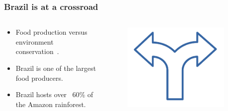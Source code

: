 \documentclass[aspectratio=169]{beamer}
\begin{document}
\begin{frame}
    \frametitle{Brazil is at a crossroad}
    \begin{columns}
        \begin{column}{0.5\textwidth}
            \begin{itemize}
                \item Food production versus environment 
                    conservation~\cite{garnett2011}.
                \item Brazil is one of the largest food producers. 
                \item Brazil hosts over ~60\% of the Amazon rainforest.
            \end{itemize}
        \end{column}
        \begin{column}{0.5\textwidth}
            \begin{figure}
                \centering
                \includegraphics[width=0.9\textwidth]{img/crossroad.png}
            \end{figure}
        \end{column}
    \end{columns}
\end{frame}
\end{document}
